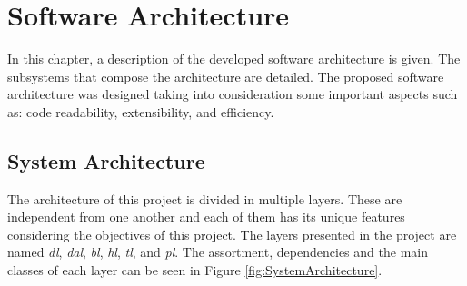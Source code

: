 \chapter{Software Architecture}
\label{chap:Architecture}
\thispagestyle{plain}

In this chapter, a description of the developed software architecture is given. The subsystems that compose the architecture are detailed. The proposed software architecture was designed taking into consideration some important aspects such as: code readability, extensibility, and efficiency.

\section{System Architecture}

The architecture of this project is divided in multiple layers. These are independent from one another and each of them has its unique features considering the objectives of this project. The layers presented in the project are named \textit{\gls{dl}}, \textit{\gls{dal}}, \textit{\gls{bl}}, \textit{\gls{hl}}, \textit{\gls{tl}}, and \textit{\gls{pl}}. The assortment, dependencies and the main classes of each layer can be seen in Figure \ref{fig:SystemArchitecture}.

